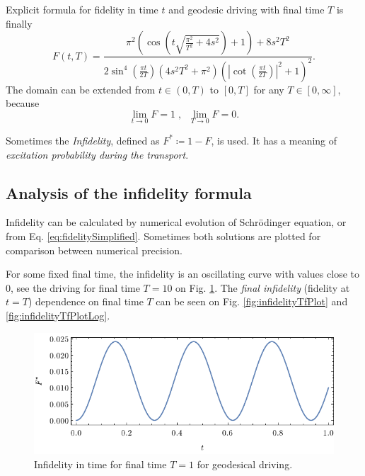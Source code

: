 Explicit formula for fidelity in time $t$ and geodesic driving with final time $T$ is finally
\begin{equation}
    F(t,T)=\frac{\pi ^2 \left(\cos \left(t \sqrt{\frac{\pi ^2}{T^2}+4 s^2}\right)+1\right)+8 s^2 T^2}{2 \sin ^4\left(\frac{\pi  t}{2 T}\right) \left(4 s^2 T^2+\pi ^2\right) \left(\left| \cot \left(\frac{\pi  t}{2 T}\right)\right|^2+1\right)^2}.
    \label{eq:fidelitySimplified}
\end{equation}
The domain can be extended from $t\in(0,T)$ to $[0,T]$ for any $T\in[0,\infty]$, because 
$$
    \lim_{t\rightarrow 0}F=1\; ,\;\; \lim_{T\rightarrow 0}F=0.
$$

Sometimes the \emph{Infidelity}, defined as $F^*\coloneqq 1-F$, is used. It has a meaning of \emph{excitation probability during the transport}.


\subsection{Analysis of the infidelity formula}
Infidelity can be calculated by numerical evolution of Schr\"odinger equation, or from Eq. \ref{eq:fidelitySimplified}. Sometimes both solutions are plotted for comparison between numerical precision. 

For some fixed final time, the infidelity is an oscillating curve with values close to $0$, see the driving for final time $T=10$ on Fig. \ref{fig:infidelityTimePlot}. The \emph{final infidelity} (fidelity at $t=T$) dependence on final time $T$ can be seen on Fig. \ref{fig:infidelityTfPlot} and \ref{fig:infidelityTfPlotLog}.
\begin{figure}[H]
    \centering
    \includegraphics[scale=1.2]{../img/infidelityTimePlotGeod.pdf}
    \caption{Infidelity in time for final time $T=1$ for geodesical driving.}
  \label{fig:infidelityTimePlot}
\end{figure}


